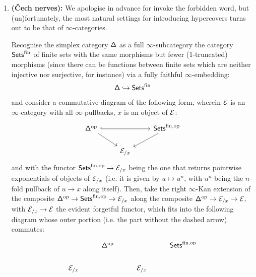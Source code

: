                 \begin{remark} \label{remark: hypercovers_alt_def}
                    \noindent
                    \begin{enumerate}
                        \item \textbf{(\v{C}ech nerves):} We apologise in advance for invoke the forbidden word, but (un)fortunately, the most natural settings for introducing hypercovers turns out to be that of $\infty$-categories. 
                        
                        Recognise the simplex category $\simp$ as a full $\infty$-subcategory the category $\Sets^{\fin}$ of finite sets with the same morphisms but fewer ($1$-truncated) morphisms (since there can be functions between finite sets which are neither injective nor surjective, for instance) via a fully faithful $\infty$-embedding:
                            $$\simp \hookrightarrow \Sets^{\fin}$$
                        and consider a commutative diagram of the following form, wherein $\E$ is an $\infty$-category with all $\infty$-pullbacks, $x$ is an object of $\E$:
                            $$
                                \begin{tikzcd}
                                	{\simp^{\op}} && {\Sets^{\fin, \op}} \\
                                	& \E_{/x}
                                	\arrow[hook, from=1-1, to=1-3]
                                	\arrow[from=1-1, to=2-2]
                                	\arrow[from=1-3, to=2-2]
                                \end{tikzcd}
                            $$
                        and with the functor $\Sets^{\fin, \op} \to \E_{/x}$ being the one that returns pointwise exponentials of objects of $\E_{/x}$ (i.e. it is given by $u \mapsto u^n$, with $u^n$ being the $n$-fold pullback of $u \to x$ along itself). Then, take the right $\infty$-Kan extension of the composite $\simp^{\op} \to \Sets^{\fin, \op} \to \E_{/x}$ along the composite $\simp^{\op} \to \E_{/x} \to \E$, with $\E_{/x} \to \E$ the evident forgetful functor, which fits into the following diagram whose outer portion (i.e. the part without the dashed arrow) commutes:
                            $$
                                \begin{tikzcd}
                                	& {\simp^{\op}} && {\Sets^{\fin, \op}} \\
                                	{\E_{/x}} && {\E_{/x}} \\

\end{tikzcd}$$
\end{enumerate}
\end{remark}
